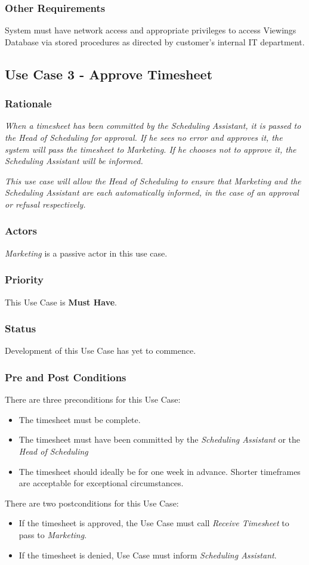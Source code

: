 \documentclass[11pt, oneside]{article}
\begin{document}
\subsubsection*{Other Requirements}
System must have network access and appropriate privileges to access Viewings Database via stored procedures as directed by customer's internal IT department.

\subsection{Use Case 3 - Approve Timesheet}
\subsubsection*{Rationale}
\textit{When a timesheet has been committed by the Scheduling Assistant, it is passed to the Head of Scheduling for approval. If he sees no error and approves it, the system will pass the timesheet to Marketing. If he chooses not to approve it, the Scheduling Assistant will be informed.}

\textit{This use case will allow the Head of Scheduling to ensure that Marketing and the Scheduling Assistant are each automatically informed, in the case of an approval or refusal respectively.}
\subsubsection*{Actors}
\textit{Marketing} is a passive actor in this use case.
\subsubsection*{Priority}
This Use Case is \textbf{Must Have}.
\subsubsection*{Status}
Development of this Use Case has yet to commence.
\subsubsection*{Pre and Post Conditions}
There are three preconditions for this Use Case:
\begin{itemize}
\item The timesheet must be complete.
\item The timesheet must have been committed by the \textit{Scheduling Assistant} or the \textit{Head of Scheduling}
\item The timesheet should ideally be for one week in advance. Shorter timeframes are acceptable for exceptional circumstances.
\end{itemize}
There are two postconditions for this Use Case:
\begin{itemize}
\item If the timesheet is approved, the Use Case must call \textit{Receive Timesheet} to pass to \textit{Marketing}.
\item If the timesheet is denied, Use Case must inform \textit{Scheduling Assistant}.
\end{itemize}
\end{document}
